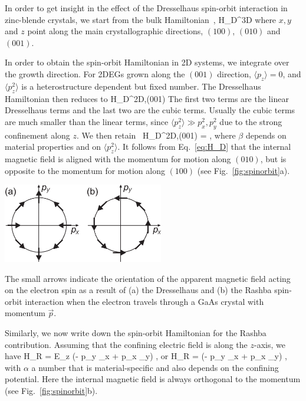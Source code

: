 \documentclass[12pt,aps,nofootinbib]{revtex4-1}
\begin{document}
In order to get insight in the effect of the Dresselhaus
spin-orbit interaction in zinc-blende crystals, we start from the
bulk Hamiltonian~\cite{dyakonov71,wrinkler03}, 
\be 
{\cal H}_D^{3D}  
\ee 
where $x, y$ and $z$ point along
the main crystallographic directions, $(100)$, $(010)$ and
$(001)$.

In order to obtain the spin-orbit Hamiltonian in 2D systems, we
integrate over the growth direction. For 2DEGs grown along the
$(001)$ direction, $\langle p_z \rangle = 0$, and $\langle p_z^2
\rangle$ is a heterostructure dependent but fixed number. The
Dresselhaus Hamiltonian then reduces to 
\be 
{\cal H}_D^{2D,(001)}
\ee 
The first two terms are the linear Dresselhaus terms and the
last two are the cubic terms. Usually the cubic terms are much
smaller than the linear terms, since $\langle p_z^2 \rangle \gg
p_x^2, p_y^2$ due to the strong confinement along $z$. We then
retain~\cite{dresselhaus55} 
\be 
{\cal H}_D^{2D,(001)} =  \;, \label{eq:H_D} 
\ee 
where $\beta$
depends on material properties and on $\langle p_z^2 \rangle$. It
follows from Eq.~\ref{eq:H_D} that the internal magnetic field is
aligned with the momentum for motion along $(010)$, but is
opposite to the momentum for motion along $(100)$ (see
Fig.~\ref{fig:spinorbit}a).

\bfig
\begin{center}
\includegraphics[width=7cm]{hanson_fig19.eps}
\end{center}
\caption{The small arrows indicate the orientation of the apparent
magnetic field acting on the electron spin as a result of (a) the
Dresselhaus and (b) the Rashba spin-orbit interaction when the
electron travels through a GaAs crystal with momentum $\vec{p}$.}
\label{fig:spinorbit} \efig

Similarly, we now write down the spin-orbit Hamiltonian for the
Rashba contribution. Assuming that the confining electric field is
along the $z$-axis, we have 
\be 
{\cal H}_R \; \vec{\sigma} = E_z (- p_y  \sigma_x + p_x \sigma_y) \;, 
\ee
or 
\be 
{\cal H}_R = \alpha (- p_y \sigma_x + p_x \sigma_y) \;, 
\label{eq:H_R} 
\ee 
with $\alpha$ a number that is
material-specific and also depends on the confining potential.
Here the internal magnetic field is always orthogonal to the
momentum (see Fig.~\ref{fig:spinorbit}b).
\end{document}
